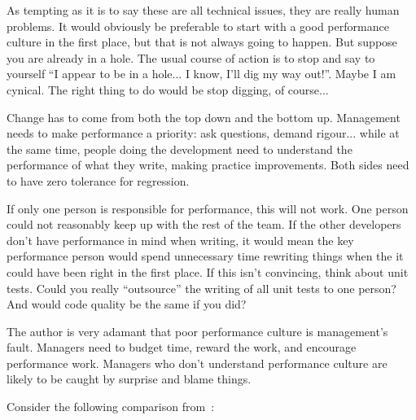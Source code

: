 \documentclass[a4paper]{report}
\begin{document}
As tempting as it is to say these are all technical issues, they are really human problems. It would obviously be preferable to start with a good performance culture in the first place, but that is not always going to happen. But suppose you are already in a hole. The usual course of action is to stop and say to yourself ``I appear to be in a hole... I know, I'll dig my way out!''. Maybe I am cynical. The right thing to do would be stop digging, of course...

Change has to come from both the top down and the bottom up. Management needs to make performance a priority: ask questions, demand rigour... while at the same time, people doing the development need to understand the performance of what they write, making practice improvements. Both sides need to have zero tolerance for regression.

If only one person is responsible for performance, this will not work. One person could not reasonably keep up with the rest of the team. If the other developers don't have performance in mind when writing, it would mean the key performance person would spend unnecessary time rewriting things when the it could have been right in the first place. If this isn't convincing, think about unit tests. Could you really ``outsource'' the writing of all unit tests to one person? And would code quality be the same if you did?

The author is very adamant that poor performance culture is management's fault. Managers need to budget time, reward the work, and encourage performance work. Managers who don't understand performance culture are likely to be caught by surprise and blame things. 

Consider the following comparison from~\cite{perfculture}:
\end{document}
